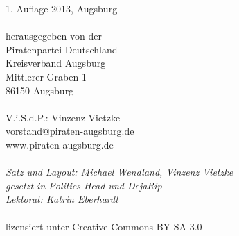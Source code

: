 \thispagestyle{empty}
\vspace*{\fill}
\begin{minipage}{\textwidth}
  \begin{small}
    \begin{singlespace}
       1. Auflage 2013, Augsburg\\
       \\
       herausgegeben von der\\
       Piratenpartei Deutschland\\
       Kreisverband Augsburg\\
       Mittlerer Graben 1\\
       86150 Augsburg\\
       \\
       V.i.S.d.P.: Vinzenz Vietzke\\
       vorstand@piraten-augsburg.de\\
       www.piraten-augsburg.de\\
       \\
       \textit{
         Satz und Layout: Michael Wendland, Vinzenz Vietzke\\
         gesetzt in Politics Head und DejaRip\\
         Lektorat: Katrin Eberhardt
       }\\
       \\
       lizensiert unter Creative Commons BY-SA 3.0
    \end{singlespace}
  \end{small}
\end{minipage}